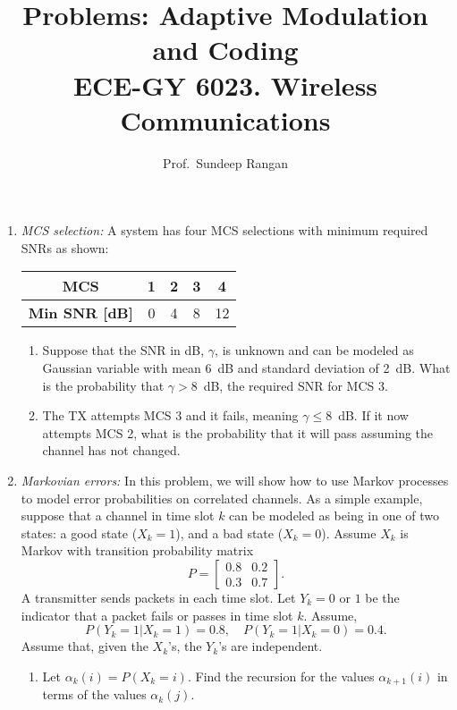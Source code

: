 \documentclass[11pt]{article}
\begin{document}
\title{Problems:  Adaptive Modulation and Coding\\
ECE-GY 6023. Wireless Communications}
\author{Prof.\ Sundeep Rangan}
\date{}

\maketitle


\begin{enumerate}
\item \emph{MCS selection:}  A system has four MCS selections with minimum required SNRs
as shown:
\begin{table}[h]
\centering
\begin{tabular}{|c|c|c|c|c|}
\hline
\textbf{MCS} & 1 & 2 & 3 & 4 \\ \hline
\textbf{Min SNR [dB]} & 0 & 4 & 8 & 12 \\ \hline
\end{tabular}
\end{table}
\begin{enumerate}[label=(\alph*)]
\item Suppose that the SNR in \si{dB}, $\gamma$, is unknown and can be modeled as Gaussian
variable with mean \SI{6}{dB} and standard deviation of \SI{2}{dB}.
What is the probability that $\gamma > 8$\, \si{dB}, the required SNR for MCS 3.

\item The TX attempts MCS 3 and it fails, meaning $\gamma \leq 8$\, \si{dB}.
If it now attempts MCS 2, what is the probability that it will pass assuming the channel has not changed.
\end{enumerate}


\item \emph{Markovian errors:}
In this problem, we will show how to use Markov processes
to model error probabilities on correlated channels.
As a simple example, suppose that a channel in time slot $k$
can be modeled as being in one of two states: a good state ($X_k=1$),
and a bad state ($X_k = 0$).
Assume $X_k$ is Markov with transition probability matrix
\[
    P = \begin{bmatrix}
        0.8 & 0.2 \\
        0.3 & 0.7
        \end{bmatrix}.
\]
A transmitter sends packets in each time slot.
Let $Y_k=0$ or $1$ be the indicator that a packet fails or
passes in time slot $k$.  Assume,
\[
    P(Y_k=1|X_k=1) = 0.8, \quad P(Y_k=1|X_k=0) = 0.4.
\]
Assume that, given the $X_k$'s, the $Y_k$'s are independent.
\begin{enumerate}[label=(\alph*)]
\item Let $\alpha_k(i) = P(X_k=i)$.  Find the recursion
for the values $\alpha_{k+1}(i)$ in terms of
the values $\alpha_k(j)$.


\end{enumerate}
\end{enumerate}
\end{document}
